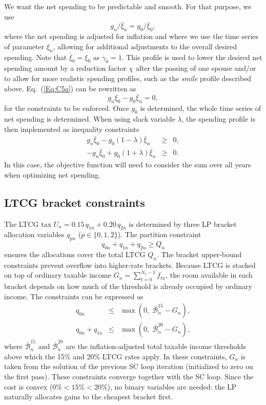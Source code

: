 \documentclass[fleqn,12pt]{report}
\begin{document}
	We want the net spending to be predictable and smooth. For that purpose, we use
\begin{equation}
	\label{Eq:C5a}
	g_{n}/\bar{\xi}_{n} = g_0/\bar{\xi}_0,
\end{equation}
where the net spending is adjusted for inflation and where we use the time series of parameter $\xi_n$,
allowing for additional adjustments to the overall desired spending.
Note that $\bar{\xi}_0 = \xi_0$ as $\gamma_0=1$.
This profile is used to lower the desired net spending amount by a reduction factor $\chi$
after the passing of one spouse and/or to allow for more realistic spending profiles, such as
the {\em smile} profile described above.
Eq.~(\ref{Eq:C5a}) can be rewritten as
\begin{equation}
	\label{Eq:C5}
	g_n \xi_0 - g_0 \bar{\xi}_n = 0,
\end{equation}
for the constraints to be enforced. Once $g_0$ is determined, the whole time series of net spending
is determined.
When using slack variable $\lambda$, the spending profile is then implemented as inequality constraints
\begin{eqnarray}
	\label{Eq:lambda}
	g_n \bar{\xi}_0 - g_0 (1 - \lambda) \bar{\xi}_n &\geq&  0, \nonumber\\
	-g_n \bar{\xi}_0 + g_0 (1 + \lambda) \bar{\xi}_n &\geq&  0.
\end{eqnarray}
In this case, the objective function will need to consider the sum over all years when optimizing net spending.

\subsection{LTCG bracket constraints}
\label{Sec:LTCG}
	The LTCG tax $U_n = 0.15\,q_{1n} + 0.20\,q_{2n}$ is determined by three LP bracket
	allocation variables $q_{pn}$ ($p \in \{0,1,2\}$).
	The partition constraint
	\begin{equation}
		\label{Eq:LTCG_partition}
		q_{0n} + q_{1n} + q_{2n} \ge Q_n
	\end{equation}
	ensures the allocations cover the total LTCG $Q_n$.
	The bracket upper-bound constraints prevent overflow into higher-rate brackets.
	Because LTCG is stacked on top of ordinary taxable income $G_n = \sum_{t=0}^{N_t-1} f_{tn}$,
	the room available in each bracket depends on how much of the threshold is already
	occupied by ordinary income. The constraints can be expressed as
	\begin{eqnarray}
		\label{Eq:LTCG2}
		q_{0n} &\le& \max(0,\; \bar{\mathcal{B}}^{15}_n - G_n), \\
		q_{0n} + q_{1n} &\le& \max(0,\; \bar{\mathcal{B}}^{20}_n - G_n), \label{Eq:LTCG3}
	\end{eqnarray}
	where $\bar{\mathcal{B}}^{15}_n$ and $\bar{\mathcal{B}}^{20}_n$ are the inflation-adjusted total taxable income
	thresholds above which the 15\% and 20\% LTCG rates apply.
	In these constraints, $G_n$ is taken from the solution of the previous SC loop
	iteration (initialized to zero on the first pass).
	These constraints converge together with the SC loop.
	Since the cost is convex ($0\% < 15\% < 20\%$), no binary variables are needed:
	the LP naturally allocates gains to the cheapest bracket first.
\end{document}
